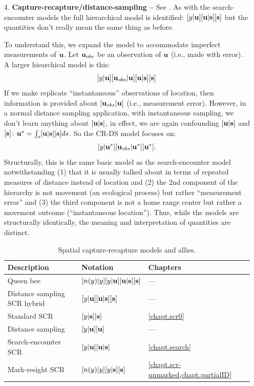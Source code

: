 \begin{itemize}
\item[4.] {\bf Capture-recapture/distance-sampling -- } See
  \citet{borchers_etal:1998}. As with the search-encounter models the
full hierarchical model is identified:
$[y|{\bf u}][{\bf u}|{\bf s}][{\bf s}]$ but the quantities don't
really mean the same thing as before.

To understand this, we expand the model to accommodate imperfect
measurements of ${\bf u}$. Let ${\bf u}_{obs}$ be an observation of
${\bf u}$ (i.e., made with error). A larger hiearchical model is this:
\[
[y|{\bf u}][{\bf u}_{obs}|{\bf u}][{\bf u}|{\bf s}][{\bf s}]
\]
If we make replicate ``instantaneous'' observations of location, then
information is provided about
 $[{\bf u}_{obs}|{\bf u}]$ (i.e., measurement error). However, in a normal
 distance sampling application, with instantaneous sampling, we don't
 learn anything about $[{\bf u}|{\bf s}]$,
in effect, we are again confounding $[{\bf u}|{\bf s}]$ and $[{\bf
  s}]$: ${\bf u}^{*} = \int_{s} [{\bf u}|{\bf s}][{\bf s}] ds$. So the CR-DS model focuses on:
\[
[y|{\bf u}^{*}][{\bf u}_{obs}|{\bf u}^{*}][{\bf u}^{*}].
\]
Structurally, this is the same basic model as the search-encounter
model notwithstanding (1) that it is usually talked about in terms of
repeated measures of distance instead of location and (2) the 2nd
component of the hierarchy is not movement (an ecological process) but
rather ``measurement error'' and (3) the third component is not a home
range center but rather a movement outcome (``instantaneous
location'').  Thus, while the models are structurally identically, the
meaning and interpretation of quantities are distinct.


\begin{table}
  \centering
  \caption{Spatial capture-recapture models and allies.}
  \begin{tabular}{lll}
    \hline
    Description & Notation & Chapters \\
    \hline
    Queen bee            & $[n(y)|y][y|{\bf u}][{\bf u}|{\bf s}][{\bf s}]$ & --- \\
    Distance sampling SCR hybrid & $[y|{\bf u}][{\bf u}|{\bf s}][{\bf s}]$ & --- \\
    Standard SCR         & $[y|{\bf s}][{\bf s}]$ & \ref{chapt.scr0} \\
    Distance sampling    & $[y|{\bf u}][{\bf u}]$ & --- \\
    Search-encounter SCR & $[y|{\bf u}][{\bf u}|{\bf s}]$ & \ref{chapt.search} \\
    Mark-resight SCR     & $[n(y)|y][y|{\bf s}][{\bf s}]$ & \ref{chapt.scr-unmarked,chapt.partialID} \\
    \hline
  \end{tabular}
  \label{modeling.tab.fam}
\end{table}



\end{itemize}

